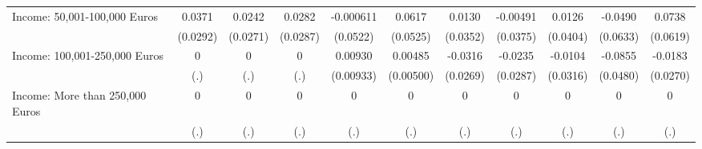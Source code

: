 {\begin{tabular}{l*{10}{c}}
Income: 50,001-100,000 Euros&      0.0371         &      0.0242         &      0.0282         &   -0.000611         &      0.0617         &      0.0130         &    -0.00491         &      0.0126         &     -0.0490         &      0.0738         \\
            &    (0.0292)         &    (0.0271)         &    (0.0287)         &    (0.0522)         &    (0.0525)         &    (0.0352)         &    (0.0375)         &    (0.0404)         &    (0.0633)         &    (0.0619)         \\
\addlinespace
Income: 100,001-250,000 Euros&           0         &           0         &           0         &     0.00930         &     0.00485         &     -0.0316         &     -0.0235         &     -0.0104         &     -0.0855         &     -0.0183         \\
            &         (.)         &         (.)         &         (.)         &   (0.00933)         &   (0.00500)         &    (0.0269)         &    (0.0287)         &    (0.0316)         &    (0.0480)         &    (0.0270)         \\
\addlinespace
Income: More than 250,000 Euros&           0         &           0         &           0         &           0         &           0         &           0         &           0         &           0         &           0         &           0         \\
            &         (.)         &         (.)         &         (.)         &         (.)         &         (.)         &         (.)         &         (.)         &         (.)         &         (.)         &         (.)         \\
\bottomrule
\end{tabular}
}
